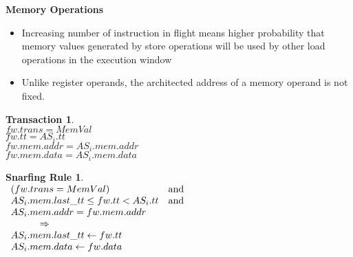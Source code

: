 \documentclass[12pt]{slides}
\newtheorem{trans}{Transaction}
\newtheorem{snarf}{Snarfing Rule}
\begin{document}
\begin{slide}
\begin{center}
\textbf {Memory Operations}
\end{center}
%
\begin{itemize}
%
\item 
Increasing number of instruction in flight means higher
probability that memory values generated by store operations will
be used by other load operations in the execution window
%
\item
Unlike register operands, the
architected address of a memory operand is not fixed.  
%
\end{itemize}

\begin{trans}
 \mbox{} \\
 \indent $fw.trans = MemVal$ \\
 \indent $fw.tt = AS_i.tt$ \\
 \indent $fw.mem.addr = AS_i.mem.addr $ \\
 \indent $fw.mem.data = AS_i.mem.data $
 \end{trans}


\begin{snarf}
\label{snar:memval}
\mbox{} \\
\(
\begin{array}{ll}
(fw.trans = MemVal) & \textup{and} \\
AS_i.mem.last\_tt \leq fw.tt < AS_i.tt & \textup{and}\\
AS_i.mem.addr = fw.mem.addr \\
\hspace{3em} \Rightarrow \\
AS_i.mem.last\_tt \leftarrow fw.tt\\
AS_i.mem.data \leftarrow fw.data
\end{array}
\)
\end{snarf}

\end{slide}
\end{document}
